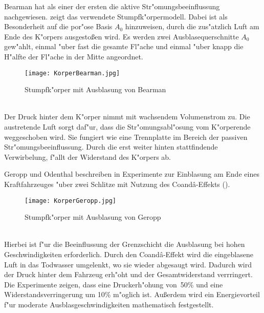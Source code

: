 Bearman \cite{Hucho.2011} hat als einer der ersten die aktive Str"omungsbeeinflussung nachgewiesen.  zeigt das verwendete Stumpfk"orpermodell. Dabei ist als Besonderheit auf die por"ose Basis \(A_{0}\) hinzuweisen, durch die zus"atzlich Luft am Ende des K"orpers ausgesto\ss{}en wird. Es werden zwei Ausblasequerschnitte \(A_{0}\) gew"ahlt, einmal "uber fast die gesamte Fl"ache und einmal "uber knapp die H"alfte der Fl"ache in der Mitte angeordnet.
\begin{figure}[h]
	\centering
	\texttt{[image: KorperBearman.jpg]}
	\caption{Stumpfk"orper mit Ausblasung von Bearman \cite{Hucho.2011}}
	\label{fig:Bearman}
\end{figure}\\
Der Druck hinter dem K"orper nimmt mit wachsendem Volumenstrom zu. Die austretende Luft sorgt daf"ur, dass die Str"omungsabl"osung vom K"orperende weggeschoben wird. Sie fungiert wie eine Trennplatte im Bereich der passiven Str"omungsbeeinflussung. Durch die erst weiter hinten stattfindende Verwirbelung, f"allt der Widerstand des K"orpers ab.

Geropp und Odenthal beschreiben in \cite{Geropp.2000} Experimente zur Einblasung am Ende eines Kraftfahrzeuges "uber zwei Schlitze mit Nutzung des Coand\^{a}-Effekts ().
\begin{figure}[h]
	\centering
	\texttt{[image: KorperGeropp.jpg]}
	\caption{Stumpfk"orper mit Ausblasung von Geropp \cite{Geropp.2000}}
	\label{fig:Geropp}
\end{figure}\\
Hierbei ist f"ur die Beeinflussung der Grenzschicht die Ausblasung bei hohen Geschwindigkeiten erforderlich. Durch den Coand\^{a}-Effekt wird die eingeblasene Luft in das Todwasser umgelenkt, wo sie wieder abgesaugt wird. Dadurch wird der Druck hinter dem Fahrzeug erh"oht und der Gesamtwiderstand verrringert. Die Experimente zeigen, dass eine Druckerh"ohung von~50\% und eine Widerstandsverringerung um 10\% m"oglich ist. Au\ss{}erdem wird ein Energievorteil f"ur moderate Ausblasgeschwindigkeiten mathematisch festgestellt.

